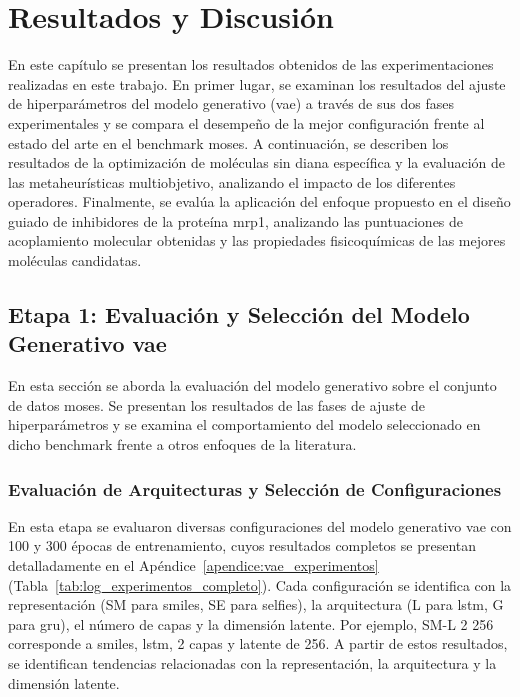 \chapter{Resultados y Discusión}
\label{ch:resultados}

En este capítulo se presentan los resultados obtenidos de las experimentaciones realizadas en este trabajo. En primer lugar, se examinan los resultados del ajuste de hiperparámetros del modelo generativo (\gls{vae}) a través de sus dos fases experimentales y se compara el desempeño de la mejor configuración frente al estado del arte en el benchmark \gls{moses}. A continuación, se describen los resultados de la optimización de moléculas sin diana específica y la evaluación de las metaheurísticas multiobjetivo, analizando el impacto de los diferentes operadores. Finalmente, se evalúa la aplicación del enfoque propuesto en el diseño guiado de inhibidores de la proteína \gls{mrp1}, analizando las puntuaciones de acoplamiento molecular obtenidas y las propiedades fisicoquímicas de las mejores moléculas candidatas.

\section{Etapa 1: Evaluación y Selección del Modelo Generativo \texorpdfstring{\acrshort{vae}}{VAE}}
\label{sec:res_vae}

En esta sección se aborda la evaluación del modelo generativo sobre el conjunto de datos \gls{moses}. Se presentan los resultados de las fases de ajuste de hiperparámetros y se examina el comportamiento del modelo seleccionado en dicho benchmark frente a otros enfoques de la literatura.

\subsection{Evaluación de Arquitecturas y Selección de Configuraciones}
\label{subsec:res_vae_fase1}
\label{subsec:res_vae_hiperparametros}

En esta etapa se evaluaron diversas configuraciones del modelo generativo \gls{vae} con 100 y 300 épocas de entrenamiento, cuyos resultados completos se presentan detalladamente en el Apéndice~\ref{apendice:vae_experimentos} (Tabla~\ref{tab:log_experimentos_completo}). Cada configuración se identifica con la representación (SM para \gls{smiles}, SE para \gls{selfies}), la arquitectura (L para \gls{lstm}, G para \gls{gru}), el número de capas y la dimensión latente. Por ejemplo, SM-L 2 256 corresponde a \gls{smiles}, \gls{lstm}, 2 capas y latente de 256. A partir de estos resultados, se identifican tendencias relacionadas con la representación, la arquitectura y la dimensión latente.

